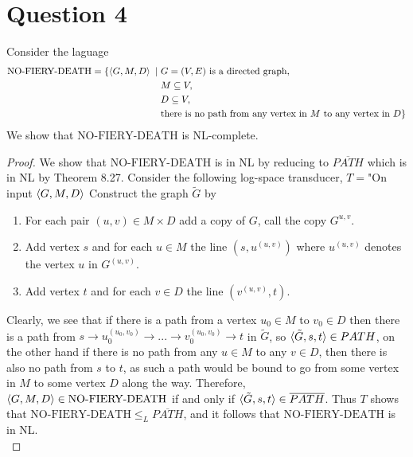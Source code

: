 \documentclass[a4paper,11pt]{article}
\newcommand{\pipe}{\ \vert \ }
\numberwithin{equation}{section}
\begin{document}
	\section*{Question 4}
	Consider the laguage\begin{equation*}
		\begin{aligned}
		\text{NO-FIERY-DEATH}=\{\braket{G,M,D}\pipe &G=(V,E)\text{ is a directed graph,}\\
		&M\subseteq V,\\
		&D\subseteq V,\\
		&\text{there is no path from any vertex in $ M $ to any vertex in $ D $}\}
		\end{aligned}
	\end{equation*}
	We show that $ \text{NO-FIERY-DEATH} $ is NL-complete.
	\begin{proof}
		We show that $ \text{NO-FIERY-DEATH} $ is in NL by reducing to $ \overline{PATH} $ which is in NL by Theorem 8.27. Consider the following log-space transducer, $ T= $"On input $ \braket{G,M,D} $ Construct the graph $ \tilde{G} $ by\begin{enumerate}
			\item For each pair $ (u,v)\in M\times D $ add a copy of $ G $, call the copy $ G^{u,v} $. 
			\item Add vertex $ s $ and for each $ u\in M $ the line $ (s,u^{(u,v)}) $ where $ u^{(u,v)} $ denotes the vertex $ u $ in $ G^{(u,v)} $.
			\item Add vertex $ t $ and for each $ v\in D $ the line $ (v^{(u,v)},t) $.
		\end{enumerate}
		Clearly, we see that if there is a path from a vertex $ u_0\in M $ to $ v_0\in D $ then there is a path from $ s\to u_0^{(u_0,v_0)}\to...\to v_0^{(u_0,v_0)}\to t $ in $ \tilde{G} $, so $ \braket{\tilde{G},s,t}\in PATH $, on the other hand if there is no path from any $ u\in M $ to any $ v\in D $, then there is also no path from $ s $ to $ t $, as such a path would be bound to go from some vertex in $ M $ to some vertex $ D $ along the way. Therefore, $ \braket{G,M,D}\in \text{NO-FIERY-DEATH} $ if and only if $ \braket{\tilde{G},s,t}\in \overline{PATH} $. Thus $ T $ shows that $ \text{NO-FIERY-DEATH}\leq_L \overline{PATH} $, and it follows that $ \text{NO-FIERY-DEATH} $ is in NL.\\

\end{proof}
\end{document}
